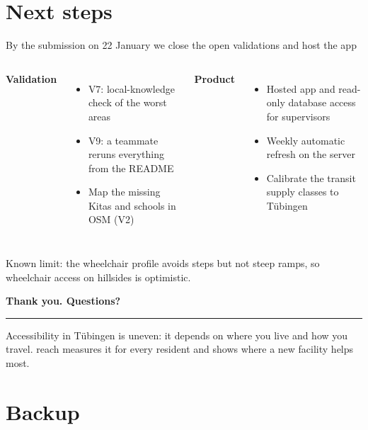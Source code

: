 \documentclass[aspectratio=169,10pt]{beamer}
\begin{document}
\section{Next steps}

\begin{frame}{By the submission on 22 January we close the open validations and host the app}
  \begin{columns}[T,onlytextwidth]
      \textbf{Validation}
      \begin{itemize}
        \item V7: local-knowledge check of the worst areas
        \item V9: a teammate reruns everything from the README
        \item Map the missing Kitas and schools in OSM (V2)
      \end{itemize}
      \textbf{Product}
      \begin{itemize}
        \item Hosted app and read-only database access for supervisors
        \item Weekly automatic refresh on the server
        \item Calibrate the transit supply classes to Tübingen
      \end{itemize}
  \end{columns}
  \vspace{6mm}
  {\footnotesize\color{muted}Known limit: the wheelchair profile avoids steps but not steep
  ramps, so wheelchair access on hillsides is optimistic.}
\end{frame}

{
\begin{frame}
  \vfill
  {\Large\bfseries Thank you. Questions?\par}
  \vskip4mm
  {\color{accent}\rule{25mm}{2pt}}\par\vskip4mm
  Accessibility in Tübingen is uneven: it depends on where you live and how you travel.
  reach measures it for every resident and shows where a new facility helps most.\par
  \vfill
\end{frame}}

\backupslides
\section*{Backup}
\end{document}
